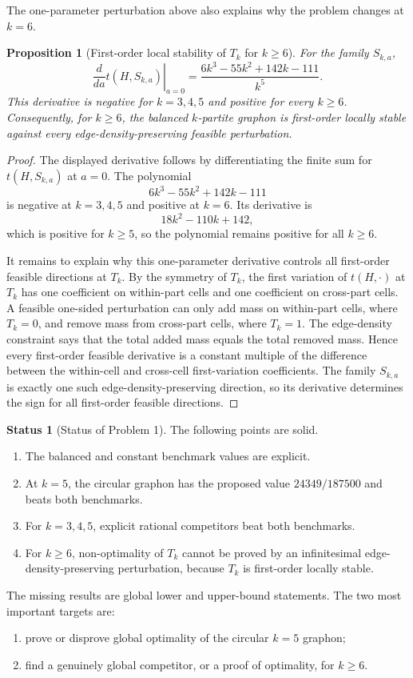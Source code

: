 \documentclass[11pt]{amsart}
\newtheorem{proposition}[theorem]{Proposition}
\theoremstyle{definition}
\newtheorem{status}[theorem]{Status}
\newcommand{\1}{\mathbf 1}
\begin{document}
The one-parameter perturbation above also explains why the problem changes at $k=6$.

\begin{proposition}[First-order local stability of $T_k$ for $k\ge 6$]
For the family $S_{k,a}$,
\[
   \left.\frac{d}{da}t(H,S_{k,a})\right|_{a=0}
   =\frac{6k^3-55k^2+142k-111}{k^5}.
\]
This derivative is negative for $k=3,4,5$ and positive for every $k\ge 6$.  Consequently, for $k\ge 6$, the balanced $k$-partite graphon is first-order locally stable against every edge-density-preserving feasible perturbation.
\end{proposition}

\begin{proof}
The displayed derivative follows by differentiating the finite sum for $t(H,S_{k,a})$ at $a=0$.  The polynomial
\[
   6k^3-55k^2+142k-111
\]
is negative at $k=3,4,5$ and positive at $k=6$.  Its derivative is
\[
   18k^2-110k+142,
\]
which is positive for $k\ge 5$, so the polynomial remains positive for all $k\ge 6$.

It remains to explain why this one-parameter derivative controls all first-order feasible directions at $T_k$.  By the symmetry of $T_k$, the first variation of $t(H,\cdot)$ at $T_k$ has one coefficient on within-part cells and one coefficient on cross-part cells.  A feasible one-sided perturbation can only add mass on within-part cells, where $T_k=0$, and remove mass from cross-part cells, where $T_k=1$.  The edge-density constraint says that the total added mass equals the total removed mass.  Hence every first-order feasible derivative is a constant multiple of the difference between the within-cell and cross-cell first-variation coefficients.  The family $S_{k,a}$ is exactly one such edge-density-preserving direction, so its derivative determines the sign for all first-order feasible directions.
\end{proof}

\begin{status}[Status of Problem 1]
The following points are solid.
\begin{enumerate}[label=(\roman*)]
\item The balanced and constant benchmark values are explicit.
\item At $k=5$, the circular graphon has the proposed value $24349/187500$ and beats both benchmarks.
\item For $k=3,4,5$, explicit rational competitors beat both benchmarks.
\item For $k\ge 6$, non-optimality of $T_k$ cannot be proved by an infinitesimal edge-density-preserving perturbation, because $T_k$ is first-order locally stable.
\end{enumerate}
The missing results are global lower and upper-bound statements.  The two most important targets are:
\begin{enumerate}[label=(\alph*)]
\item prove or disprove global optimality of the circular $k=5$ graphon;
\item find a genuinely global competitor, or a proof of optimality, for $k\ge 6$.
\end{enumerate}
\end{status}
\end{document}
